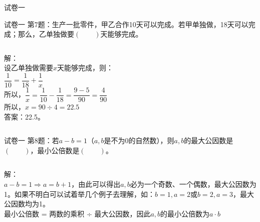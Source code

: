 \documentclass[aspectratio=169]{ctexbeamer} %
\begin{document}
\begin{frame}[t]{试卷一}

\end{frame}

\begin{frame}[t]{试卷一}
第7题：生产一批零件，甲乙合作10天可以完成。若甲单独做，18天可以完成；那么，乙单独做要$(\qquad)$天能够完成。
\pause
\begin{columns}
解：\\
设乙单独做需要$x$天能够完成，则： \\
$\dfrac{1}{10} = \dfrac{1}{18} + \dfrac{1}{x}$ \\
所以，$ \dfrac{1}{x} = \dfrac{1}{10} - \dfrac{1}{18} = \dfrac{9-5}{90} = \dfrac{4}{90}$ \\
所以，$x = 90 \div 4 = 22.5$ \\
答案：\alert{22.5}。
\end{columns}
\end{frame}

\begin{frame}[t]{试卷一}
第8题：若$a - b = 1$（$a, b$是不为$0$的自然数），则$a, b$的最大公因数是$(\qquad)$，最小公倍数是$(\qquad)$。
\pause
\begin{columns}
解：\\
$a - b = 1 \Rightarrow a = b + 1$，由此可以得出$a, b$必为一个奇数、一个偶数，最大公因数为1。如果不明白可以试着举几个例子去理解，如：$b = 1, a = 2$或$b = 2, a = 3$，最大公因数均为\alert{1}。\\
\pause
最小公倍数 = 两数的乘积 ÷ 最大公因数，因此$a, b$的最小公倍数为\alert{$a \cdot b$}
\end{columns}
\end{frame}
\end{document}
